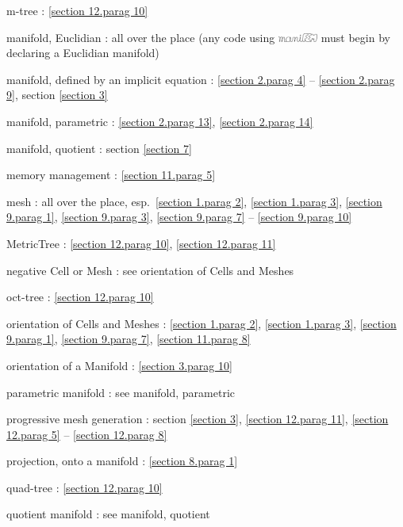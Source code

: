 \documentclass[a4paper]{scrreprt}
\def\numb{}
\newcommand\maniFEM{\leavevmode\hbox{\includegraphics[width=13mm]{manifem-small}}}
\newcommand\verm[1]{\textcolor{manif}{#1}}
\renewcommand\tt{\normalfont\ttfamily}
\begin{document}
\noindent
m-tree : \ref{\numb section 12.\numb parag 10}

\noindent
manifold, Euclidian : all over the place\hfil\break
\hglue 15mm (any code using {\maniFEM} must begin by declaring a Euclidian manifold)

\noindent
manifold, defined by an implicit equation :
\ref{\numb section 2.\numb parag 4} -- \ref{\numb section 2.\numb parag 9},
section \ref{\numb section 3}

\noindent
manifold, parametric : \ref{\numb section 2.\numb parag 13},
\ref{\numb section 2.\numb parag 14}

\noindent
manifold, quotient : section \ref{\numb section 7}

\noindent
memory management : \ref{\numb section 11.\numb parag 5}

\noindent
mesh : all over the place, esp.\ \ref{\numb section 1.\numb parag 2},
\ref{\numb section 1.\numb parag 3}, \ref{\numb section 9.\numb parag 1},
\ref{\numb section 9.\numb parag 3},
\ref{\numb section 9.\numb parag 7} -- \ref{\numb section 9.\numb parag 10}

\noindent
{\small\tt \verm{MetricTree}} : \ref{\numb section 12.\numb parag 10},
\ref{\numb section 12.\numb parag 11}

\noindent
negative {\small\tt \verm{Cell}} or {\small\tt \verm{Mesh}} :
see orientation of {\small\tt \verm{Cell}}s and {\small\tt \verm{Mesh}}es

\noindent
oct-tree : \ref{\numb section 12.\numb parag 10}

\noindent
orientation of {\small\tt \verm{Cell}}s and {\small\tt \verm{Mesh}}es :
\ref{\numb section 1.\numb parag 2},
\ref{\numb section 1.\numb parag 3}, \ref{\numb section 9.\numb parag 1},
\ref{\numb section 9.\numb parag 7}, \ref{\numb section 11.\numb parag 8}

\noindent
orientation of a {\small\tt \verm{Manifold}} : \ref{\numb section 3.\numb parag 10}

\noindent
parametric manifold : see manifold, parametric

\noindent
progressive mesh generation : section \ref{\numb section 3},
\ref{\numb section 12.\numb parag 11},
\ref{\numb section 12.\numb parag 5} -- \ref{\numb section 12.\numb parag 8}

\noindent
projection, onto a manifold :
\ref{\numb section 8.\numb parag 1}

\noindent
quad-tree : \ref{\numb section 12.\numb parag 10}

\noindent
quotient manifold : see manifold, quotient
\end{document}
